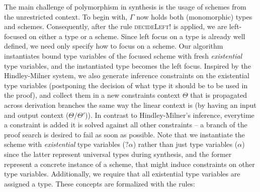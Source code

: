 \documentclass{llncs}
\begin{document}
The main challenge of polymorphism in synthesis is the usage of
schemes from the unrestricted context.  To begin with, $\Gamma$ now
holds both (monomorphic) types and schemes. Consequently, after the
rule \textsc{decideLeft!} is applied, we are left-focused on either a
type or a scheme. Since left focus on a type is already well defined,
we need only specify how to focus on a scheme.
%
Our algorithm instantiates bound type variables of the focused scheme
with fresh \emph{existential} type variables, and the instantiated type becomes the
left focus. Inspired by the Hindley-Milner system, we also generate
inference constraints on the existential type variables (postponing
the decision of what type it should be to be used in the proof), and
collect them in a new constraints context $\Theta$ that is propagated
across derivation branches the same way the linear context is (by
having an input and output context ($\Theta/\Theta'$)).  In contrast to
Hindley-Milner's inference, everytime a constraint is added it is
solved against all other constraints -- a branch of the proof search
is desired to fail as soon as possible.
Note that we instantiate the scheme with \emph{existential} type
variables ($?\alpha$) rather than just type variables ($\alpha$) since
the latter represent universal types during synthesis, and the former
represent a concrete instance of a scheme, that might induce
constraints on other type variables. Additionally, we require that
all existential type variables are assigned a type. These concepts are
formalized with the rules:
\end{document}
